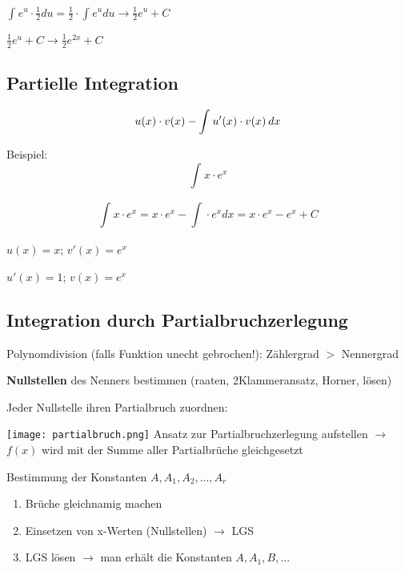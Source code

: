 \begin{multicols*}{3}
    { $ \int_{}{}e^u \cdot  \frac{1}{2}du = \frac{1}{2} \cdot  \int_{}{}e^u du \rightarrow \frac{1}{2} e^u + C   $}


    { $\frac{1}{2} e^u + C \rightarrow \frac{1}{2} e^{2x} + C$ }




    \subsection{Partielle Integration}
    {\large $$u(x)\cdot v(x) - \int_{}^{}u'(x) \cdot v(x) \hspace{2px}  dx$$}

    \begin{multicols*}{2}
        {Beispiel:}
        \[ \int_{}{}x\cdot e^x\]

        $$ \int_{}{}x\cdot e^x = x\cdot e^x -  \int_{}{}\cdot e^x dx = x\cdot e^x - e^x + C $$
        \columnbreak

        {$u(x)=x$; $v'(x)=e^x$}

        {$u'(x)=1$; $v(x)=e^x$}

    \end{multicols*}


    \vfill\null
    \columnbreak


    \subsection{Integration durch Partialbruchzerlegung}
    {    Polynomdivision (falls Funktion unecht gebrochen!): Zählergrad  $>$ Nennergrad }



    { \textbf{Nullstellen} des Nenners bestimmen (raaten, 2Klammeransatz, Horner, lösen)}

    { Jeder Nullstelle ihren Partialbruch zuordnen:}

    \texttt{[image: partialbruch.png]}
    { Ansatz zur Partialbruchzerlegung aufstellen $\rightarrow$ $f(x)$ wird mit der Summe aller Partialbrüche gleichgesetzt}

    { Bestimmung der Konstanten $A,A_1,A_2,...,A_r$}
    \begin{enumerate}
        \itemsep0em
        \item Brüche gleichnamig machen
        \item Einsetzen von x-Werten (Nullstellen) $\rightarrow$ LGS
        \item LGS lösen $\rightarrow$ man erhält die Konstanten $A,A_1,B,...$
    \end{enumerate}



\end{multicols*}
